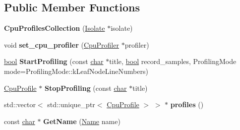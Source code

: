 \subsection*{Public Member Functions}
\begin{DoxyCompactItemize}
\item 
\mbox{\label{classv8_1_1internal_1_1CpuProfilesCollection_a8cf6fe6fa3baf83ea1c60683c1dc953a}} 
{\bfseries Cpu\+Profiles\+Collection} (\mbox{\hyperlink{classv8_1_1internal_1_1Isolate}{Isolate}} $\ast$isolate)
\item 
\mbox{\label{classv8_1_1internal_1_1CpuProfilesCollection_aefc820f795001ef81f55d23614a41adb}} 
void {\bfseries set\+\_\+cpu\+\_\+profiler} (\mbox{\hyperlink{classv8_1_1internal_1_1CpuProfiler}{Cpu\+Profiler}} $\ast$profiler)
\item 
\mbox{\label{classv8_1_1internal_1_1CpuProfilesCollection_a9582003cf990014739a59f74d1036559}} 
\mbox{\hyperlink{classbool}{bool}} {\bfseries Start\+Profiling} (const \mbox{\hyperlink{classchar}{char}} $\ast$title, \mbox{\hyperlink{classbool}{bool}} record\+\_\+samples, Profiling\+Mode mode=Profiling\+Mode\+::k\+Leaf\+Node\+Line\+Numbers)
\item 
\mbox{\label{classv8_1_1internal_1_1CpuProfilesCollection_ae11f54582389f8e972760151438df330}} 
\mbox{\hyperlink{classv8_1_1internal_1_1CpuProfile}{Cpu\+Profile}} $\ast$ {\bfseries Stop\+Profiling} (const \mbox{\hyperlink{classchar}{char}} $\ast$title)
\item 
\mbox{\label{classv8_1_1internal_1_1CpuProfilesCollection_af37ea3e696316793af8a80f377854a12}} 
std\+::vector$<$ std\+::unique\+\_\+ptr$<$ \mbox{\hyperlink{classv8_1_1internal_1_1CpuProfile}{Cpu\+Profile}} $>$ $>$ $\ast$ {\bfseries profiles} ()
\item 
\mbox{\label{classv8_1_1internal_1_1CpuProfilesCollection_ab3cd9b41dec497a367826670f0a0b751}} 
const \mbox{\hyperlink{classchar}{char}} $\ast$ {\bfseries Get\+Name} (\mbox{\hyperlink{classv8_1_1internal_1_1Name}{Name}} name)
\item 

\end{DoxyCompactItemize}
